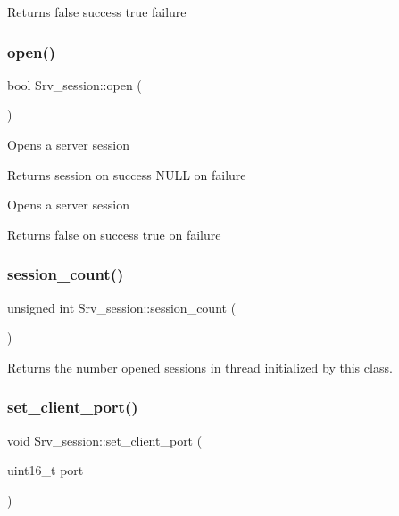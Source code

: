 \begin{DoxyReturn}{Returns}
false success true failure 
\end{DoxyReturn}
\mbox{\label{classSrv__session_a99347e58c5498ce76891ace87456562f}} 
\subsubsection{\texorpdfstring{open()}{open()}}
{\footnotesize\ttfamily bool Srv\+\_\+session\+::open (\begin{DoxyParamCaption}{ }\end{DoxyParamCaption})}

Opens a server session

\begin{DoxyReturn}{Returns}
session on success N\+U\+LL on failure
\end{DoxyReturn}
Opens a server session

\begin{DoxyReturn}{Returns}
false on success true on failure 
\end{DoxyReturn}
\mbox{\label{classSrv__session_acb3905ccf83195292e56b1ae1f4723f2}} 
\subsubsection{\texorpdfstring{session\+\_\+count()}{session\_count()}}
{\footnotesize\ttfamily unsigned int Srv\+\_\+session\+::session\+\_\+count (\begin{DoxyParamCaption}{ }\end{DoxyParamCaption})\hspace{0.3cm}{\ttfamily [static]}}

Returns the number opened sessions in thread initialized by this class. \mbox{\label{classSrv__session_a3d4af0d7cf8b34661a3ec6f839f39f7f}} 
\subsubsection{\texorpdfstring{set\+\_\+client\+\_\+port()}{set\_client\_port()}}
{\footnotesize\ttfamily void Srv\+\_\+session\+::set\+\_\+client\+\_\+port (\begin{DoxyParamCaption}\item[{uint16\+\_\+t}]{port }\end{DoxyParamCaption})}

